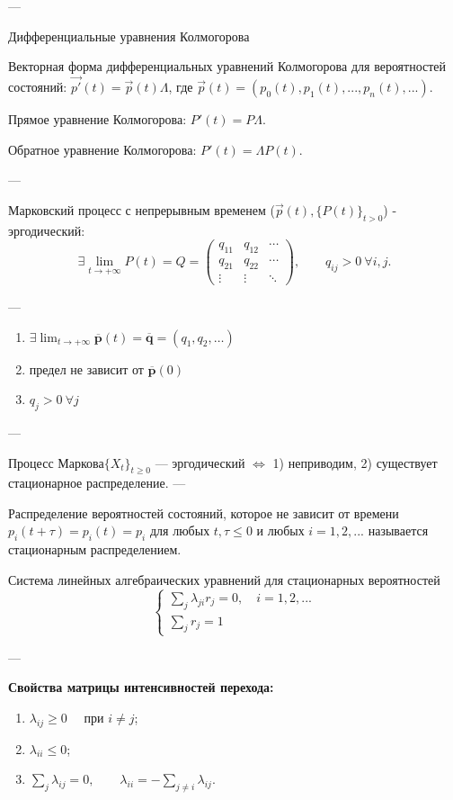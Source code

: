 ---


Дифференциальные уравнения Колмогорова

Векторная форма дифференциальных уравнений Колмогорова для вероятностей состояний:
$\vec{p'}(t)=\vec{p}(t)\Lambda$, где $\vec{p}(t)=(p_0(t),p_1(t),...,p_n(t),...)$.

Прямое уравнение Колмогорова: $P'(t)=P\Lambda$.

Обратное уравнение Колмогорова: $P'(t)=\Lambda P(t)$.

---

Марковский процесс с непрерывным временем ($\vec{p}(t), \{P(t)\}_{t>0}$) - эргодический:
\[
	\exists \lim_{t \to +\infty} {P}(t) = {Q}
	=
	\begin{pmatrix}
		q_{11} & q_{12} & \cdots \\
		q_{21} & q_{22} & \cdots \\
		\vdots & \vdots & \ddots
	\end{pmatrix},
	\qquad
	q_{ij} > 0 \ \forall i,j.
\]

---

\begin{enumerate}
	\item
	      $\displaystyle
		      \exists \lim_{t \to +\infty}
		      \overline{\mathbf{p}}(t)
		      =
		      \overline{\mathbf{q}}
		      = (q_1, q_2, \ldots)
	      $

	\item предел не зависит от $\overline{\mathbf{p}}(0)$

	\item $q_j > 0 \ \forall j$
\end{enumerate}

---

Процесс Маркова$\{ X_t \}_{t \ge 0}$ — эргодический $\Longleftrightarrow$
1) неприводим, 2) существует стационарное распределение.
---

Распределение вероятностей состояний, которое не зависит от времени $p_i(t+\tau ) = p_i(t)=p_i$
для любых $t,\tau\leq 0$ и любых $i=1,2,...$ называется стационарным распределением.

Система линейных алгебраических уравнений для стационарных вероятностей
\[
	\begin{cases}
		\sum_j  \lambda_{ji} r_j = 0, \quad i=1,2,... \\
		\sum_j r_j = 1
	\end{cases}
\]

---

\textbf{Свойства матрицы интенсивностей перехода:}
\begin{enumerate}
	\item $\lambda_{ij} \ge 0 \quad$ при $i \ne j$;
	\item $\lambda_{ii} \le 0$;
	\item $\displaystyle \sum_j \lambda_{ij} = 0,
		      \qquad
		      \lambda_{ii} = - \sum_{j \ne i} \lambda_{ij}.$
\end{enumerate}

